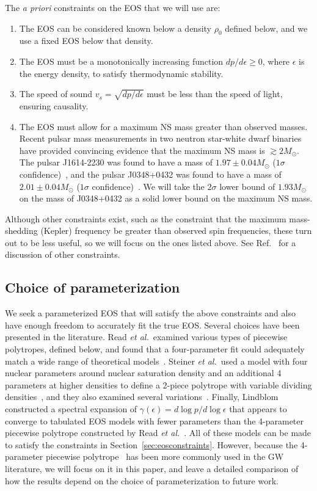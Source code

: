 \documentclass[twocolumn,prd,amssymb,aps,nofootinbib,showpacs,epsf]{revtex4}
\begin{document}
The {\it a priori} constraints on the EOS that we will use are:
\begin{enumerate}
\item The EOS can be considered known below a density $\rho_0$ defined below, and we use a fixed EOS below that density.
\item The EOS must be a monotonically increasing function $dp/d\epsilon \ge 0$, where $\epsilon$ is the energy density, to satisfy thermodynamic stability.
\item The speed of sound $v_s = \sqrt{dp/d\epsilon}$ must be less than the speed of light, ensuring causality. 
\item The EOS must allow for a maximum NS mass greater than observed masses. Recent pulsar mass measurements in two neutron star-white dwarf binaries have provided convincing evidence that the maximum NS mass is $\gtrsim 2M_\odot$. The pulsar J1614-2230 was found to have a mass of $1.97\pm0.04M_\odot$ ($1\sigma$ confidence)~\cite{DemorestPennucciRansom2010}, and the pulsar J0348+0432 was found to have a mass of $2.01\pm0.04M_\odot$ ($1\sigma$ confidence)~\cite{AntoniadisFreireWex2013}. We will take the $2\sigma$ lower bound of $1.93M_\odot$ on the mass of J0348+0432 as a solid lower bound on the maximum NS mass.
\end{enumerate}

Although other constraints exist, such as the constraint that the maximum mass-shedding (Kepler) frequency be greater than observed spin frequencies, these turn out to be less useful, so we will focus on the ones listed above. See Ref.~\cite{ReadLackey2009} for a discussion of other constraints.

\subsection{Choice of parameterization}
\label{sec:eosparam}

We seek a parameterized EOS that will satisfy the above constraints and also have enough freedom to accurately fit the true EOS. Several choices have been presented in the literature. Read {\it et al.}\ examined various types of piecewise polytropes, defined below, and found that a four-parameter fit could adequately match a wide range of theoretical models~\cite{ReadLackey2009}. Steiner {\it et al.}\ used a model with four nuclear parameters around nuclear saturation density and an additional 4 parameters at higher densities to define a 2-piece polytrope with variable dividing densities~\cite{SteinerLattimerBrown2010}, and they also examined several variations~\cite{SteinerLattimerBrown2013}. Finally, Lindblom constructed a spectral expansion of $\gamma(\epsilon) = d\log p / d\log \epsilon$ that appears to converge to tabulated EOS models with fewer parameters than the 4-parameter piecewise polytrope constructed by Read {\it et al.}~\cite{Lindblom2010}. All of these models can be made to satisfy the constraints in Section~\ref{sec:eosconstraints}. However, because the 4-parameter piecewise polytrope~\cite{ReadLackey2009} has been more commonly used in the GW literature, we will focus on it in this paper, and leave a detailed comparison of how the results depend on the choice of parameterization to future work.
\end{document}
